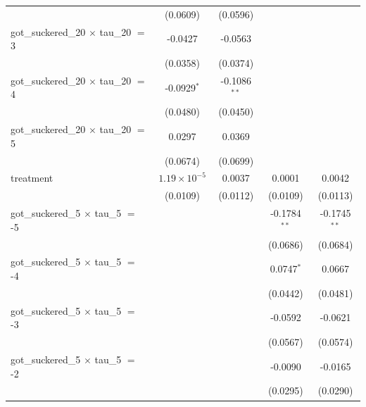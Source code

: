 \begin{tabular}{lcccc}
                                                 & (0.0609)              & (0.0596)        &                 &   \\   
   got\_suckered\_20 $\times$ tau\_20 $=$ 3      & -0.0427               & -0.0563         &                 &   \\   
                                                 & (0.0358)              & (0.0374)        &                 &   \\   
   got\_suckered\_20 $\times$ tau\_20 $=$ 4      & -0.0929$^{*}$         & -0.1086$^{**}$  &                 &   \\   
                                                 & (0.0480)              & (0.0450)        &                 &   \\   
   got\_suckered\_20 $\times$ tau\_20 $=$ 5      & 0.0297                & 0.0369          &                 &   \\   
                                                 & (0.0674)              & (0.0699)        &                 &   \\   
   treatment                                     & $1.19\times 10^{-5}$  & 0.0037          & 0.0001          & 0.0042\\   
                                                 & (0.0109)              & (0.0112)        & (0.0109)        & (0.0113)\\   
   got\_suckered\_5 $\times$ tau\_5 $=$ -5       &                       &                 & -0.1784$^{**}$  & -0.1745$^{**}$\\   
                                                 &                       &                 & (0.0686)        & (0.0684)\\   
   got\_suckered\_5 $\times$ tau\_5 $=$ -4       &                       &                 & 0.0747$^{*}$    & 0.0667\\   
                                                 &                       &                 & (0.0442)        & (0.0481)\\   
   got\_suckered\_5 $\times$ tau\_5 $=$ -3       &                       &                 & -0.0592         & -0.0621\\   
                                                 &                       &                 & (0.0567)        & (0.0574)\\   
   got\_suckered\_5 $\times$ tau\_5 $=$ -2       &                       &                 & -0.0090         & -0.0165\\   
                                                 &                       &                 & (0.0295)        & (0.0290)\\   

\end{tabular}
